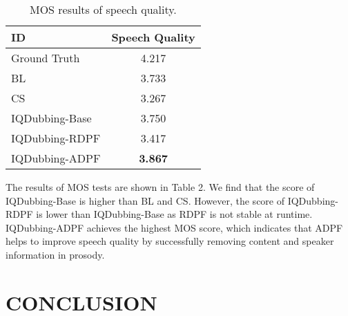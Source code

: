\documentclass{article}
\begin{document}
\begin{table}[!htbp]
\centering
\caption{MOS results of speech quality.}
\vspace{5pt}
\begin{tabular}{l|c}
\toprule
ID&Speech Quality\\
\midrule
Ground Truth& 4.217\\
\hline
BL& 3.733\\
\hline
CS& 3.267\\
\hline
IQDubbing-Base& 3.750\\
\hline
IQDubbing-RDPF& 3.417\\
\hline
IQDubbing-ADPF& \textbf{3.867}\\
\bottomrule
\end{tabular}
\end{table}




The results of MOS tests are shown in Table 2. We find that the score of IQDubbing-Base is higher than BL and CS. However, the score of IQDubbing-RDPF is lower than IQDubbing-Base as RDPF is not stable at runtime. IQDubbing-ADPF achieves the  highest MOS score, which indicates that ADPF helps to improve speech quality by successfully removing content and speaker information in prosody.

\section{CONCLUSION}
\label{sec:typestyle}
\end{document}
